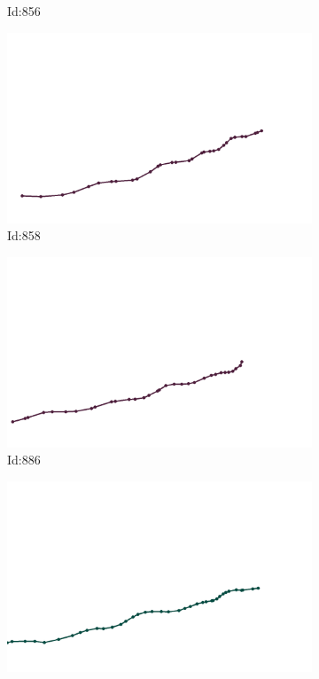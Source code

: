 \documentclass[12pt,twoside]{report}
\begin{document}
\begin{figure}
\begin{subfigure}[b]{0.20\textwidth}
\caption{Id:856}
\end{subfigure}
\begin{subfigure}[b]{0.20\textwidth}
\centering
\includegraphics[width=\textwidth]{../trajectories/858.png}
\caption{Id:858}
\end{subfigure}
\begin{subfigure}[b]{0.20\textwidth}
\centering
\includegraphics[width=\textwidth]{../trajectories/886.png}
\caption{Id:886}
\end{subfigure}
\begin{subfigure}[b]{0.20\textwidth}
\centering
\includegraphics[width=\textwidth]{../trajectories/937.png}

\end{subfigure}
\end{figure}
\end{document}
